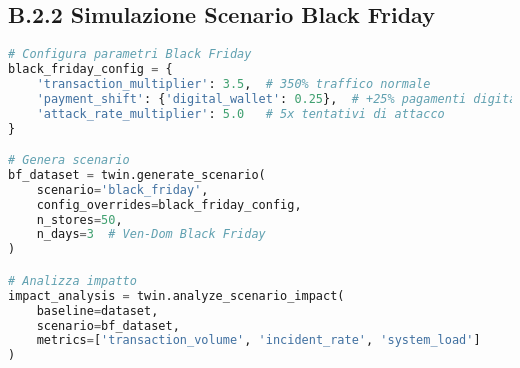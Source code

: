 \subsection{\texorpdfstring{\textbf{B.2.2 Simulazione Scenario Black Friday}}{B.2.2 - Simulazione Scenario Black Friday}}

\begin{lstlisting}[language=Python, caption={Simulazione scenario Black Friday}]
# Configura parametri Black Friday
black_friday_config = {
    'transaction_multiplier': 3.5,  # 350% traffico normale
    'payment_shift': {'digital_wallet': 0.25},  # +25% pagamenti digitali
    'attack_rate_multiplier': 5.0   # 5x tentativi di attacco
}

# Genera scenario
bf_dataset = twin.generate_scenario(
    scenario='black_friday',
    config_overrides=black_friday_config,
    n_stores=50,
    n_days=3  # Ven-Dom Black Friday
)

# Analizza impatto
impact_analysis = twin.analyze_scenario_impact(
    baseline=dataset,
    scenario=bf_dataset,
    metrics=['transaction_volume', 'incident_rate', 'system_load']
)
\end{lstlisting}

